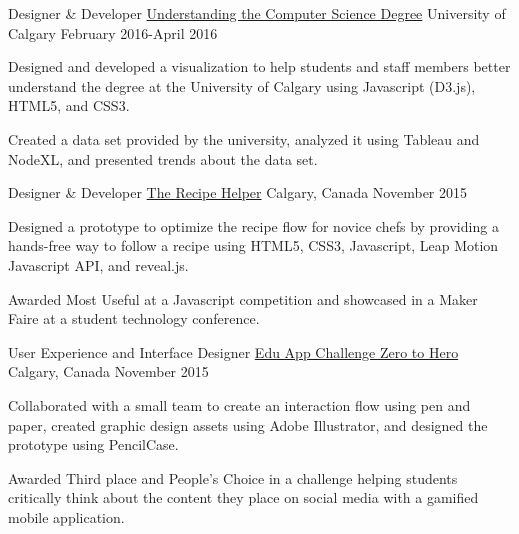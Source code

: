 \begin{cventries}
\cventry
    {Designer \& Developer}
    {\href{https://medium.com/portfolio-carrie-mah/understanding-degrees-through-better-visualizations-fec3319b7daa}{Understanding the Computer Science Degree}}
    {University of Calgary}
    {February 2016-April 2016}
    {
      \begin{cvitems}
        \item {Designed and developed a visualization to help students and staff members better understand the degree at the University of Calgary using Javascript (D3.js), HTML5, and CSS3.}
        \item {Created a data set provided by the university, analyzed it using Tableau and NodeXL, and presented trends about the data set.}
      \end{cvitems}
    }
    
    
  \cventry
    {Designer \& Developer}
    {\href{https://medium.com/portfolio-carrie-mah/the-recipe-helper-834686422f52}{The Recipe Helper}}
    {Calgary, Canada}
    {November 2015}
    {
      \begin{cvitems}
      	\item{Designed a prototype to optimize the recipe flow for novice chefs by providing a hands-free way to follow a recipe using HTML5, CSS3, Javascript, Leap Motion Javascript API, and reveal.js.}
        \item {Awarded Most Useful at a Javascript competition and showcased in a Maker Faire at a student technology conference.}
      \end{cvitems}
    }
 \cventry
    {User Experience and Interface Designer}
    {\href{https://medium.com/portfolio-carrie-mah/utilizing-gamification-to-inform-better-social-media-habits-b4f47c3e5349}{Edu App Challenge Zero to Hero}}
    {Calgary, Canada}
    {November 2015}
    {
      \begin{cvitems}
      	\item {Collaborated with a small team to create an interaction flow using pen and paper, created graphic design assets using Adobe Illustrator, and designed the prototype using PencilCase.}
        \item {Awarded Third place and People's Choice in a challenge helping students critically think about the content they place on social media with a gamified mobile application.}
      \end{cvitems}
    }
    

\end{cventries}

